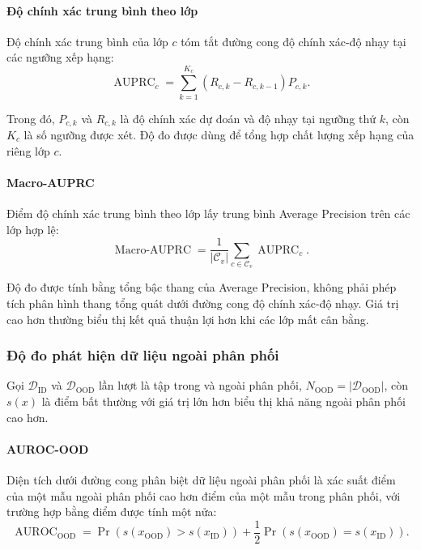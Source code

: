 \paragraph{Độ chính xác trung bình theo lớp}

Độ chính xác trung bình của lớp $c$ tóm tắt đường cong độ chính xác-độ nhạy tại các ngưỡng xếp hạng:
\begin{equation}
\operatorname{AUPRC}_c=\sum_{k=1}^{K_c}(R_{c,k}-R_{c,k-1})P_{c,k}.
\label{eq:ch4_auprc_class}
\end{equation}

Trong đó, $P_{c,k}$ và $R_{c,k}$ là độ chính xác dự đoán và độ nhạy tại ngưỡng thứ $k$, còn $K_c$ là số ngưỡng được xét. Độ đo được dùng để tổng hợp chất lượng xếp hạng của riêng lớp $c$.

\paragraph{Macro-AUPRC}

Điểm độ chính xác trung bình theo lớp \cite{Davis2006PR} lấy trung bình Average Precision trên các lớp hợp lệ:
\begin{equation}
\operatorname{Macro\text{-}AUPRC}
=\frac{1}{|\mathcal{C}_v|}\sum_{c\in\mathcal{C}_v}\operatorname{AUPRC}_c.
\label{eq:ch4_macro_auprc}
\end{equation}

Độ đo được tính bằng tổng bậc thang của Average Precision, không phải phép tích phân hình thang tổng quát dưới đường cong độ chính xác-độ nhạy. Giá trị cao hơn thường biểu thị kết quả thuận lợi hơn khi các lớp mất cân bằng.

\subsubsection{Độ đo phát hiện dữ liệu ngoài phân phối}

Gọi $\mathcal{D}_{\mathrm{ID}}$ và $\mathcal{D}_{\mathrm{OOD}}$ lần lượt là tập trong và ngoài phân phối, $N_{\mathrm{OOD}}=|\mathcal{D}_{\mathrm{OOD}}|$, còn $s(x)$ là điểm bất thường với giá trị lớn hơn biểu thị khả năng ngoài phân phối cao hơn.

\paragraph{AUROC-OOD}

Diện tích dưới đường cong phân biệt dữ liệu ngoài phân phối \cite{Hendrycks2017MSP} là xác suất điểm của một mẫu ngoài phân phối cao hơn điểm của một mẫu trong phân phối, với trường hợp bằng điểm được tính một nửa:
\begin{equation}
\operatorname{AUROC}_{\mathrm{OOD}}
=\Pr\!\left(s(x_{\mathrm{OOD}})>s(x_{\mathrm{ID}})\right)
+\frac{1}{2}\Pr\!\left(s(x_{\mathrm{OOD}})=s(x_{\mathrm{ID}})\right).
\label{eq:ch4_auroc_ood}
\end{equation}

